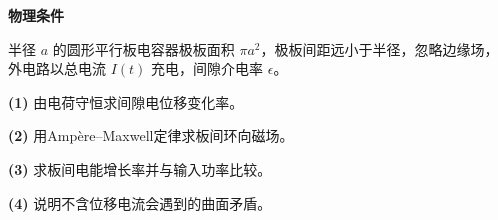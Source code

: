 \textbf{物理条件}\par 半径 \(a\) 的圆形平行板电容器极板面积 \(\pi a^2\)，极板间距远小于半径，忽略边缘场，外电路以总电流 \(I(t)\) 充电，间隙介电率 \(\epsilon\)。
\par\noindent\textbf{(1)} 由电荷守恒求间隙电位移变化率。
\par\noindent\textbf{(2)} 用Ampère–Maxwell定律求板间环向磁场。
\par\noindent\textbf{(3)} 求板间电能增长率并与输入功率比较。
\par\noindent\textbf{(4)} 说明不含位移电流会遇到的曲面矛盾。
